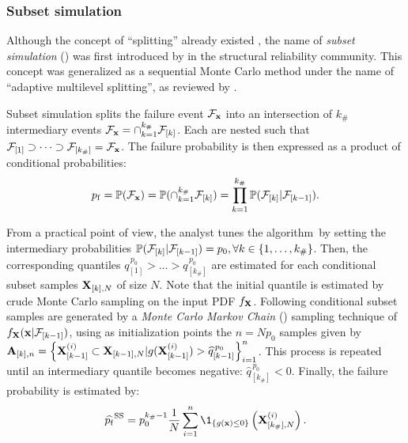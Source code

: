 

\subsubsection{Subset simulation}
Although the concept of ``splitting'' already existed \citep{kahn_1951_splitting}, the name of \textit{subset simulation} () was first introduced by \citet{AuBeck2001} in the structural reliability community. 
This concept was generalized as a sequential Monte Carlo method under the name of ``adaptive multilevel splitting'', as reviewed by \citet{cerou_2019_sequentialMC}. 

Subset simulation splits the failure event $\mathcal{F}_{{\bf x}}$ into an intersection of $k_\#$ intermediary events $\mathcal{F}_{{\bf x}} = \cap_{k=1}^{k_\#} \mathcal{F}_{[k]}$.
Each are nested such that $\mathcal{F}_{[1]} \supset \dots \supset \mathcal{F}_{[k_\#]} = \mathcal{F}_{{\bf x}}$.
The failure probability is then expressed as a product of conditional probabilities:
\begin{equation}
    p_\mathrm{f} = \mathbb{P}(\mathcal{F}_{{\bf x}}) = \mathbb{P}(\cap_{k=1}^{k_\#} \mathcal{F}_{[k]}) = \prod_{k=1}^{k_\#} \mathbb{P}(\mathcal{F}_{[k]} | \mathcal{F}_{[k-1]}).
\end{equation}

From a practical point of view, the analyst tunes the algorithm\footnotemark~by setting the intermediary probabilities $\mathbb{P}(\mathcal{F}_{[k]} | \mathcal{F}_{[k-1]}) = p_0, \forall k \in \{1, \dots, k_\# \}$. 
Then, the corresponding quantiles $q_{[1]}^{\, p_0} > \dots > q_{[k_\#]}^{\, p_0}$ are estimated for each conditional subset samples ${\bf X}_{[k], N}$ of size $N$. 
Note that the initial quantile is estimated by crude Monte Carlo sampling on the input PDF $f_{{\bf X}}$. 
Following conditional subset samples are generated by a \textit{Monte Carlo Markov Chain} () sampling technique of 
$f_{{\bf X}}({\bf x} |\mathcal{F}_{[k-1]})$, using as initialization points the $n= N p_0$ samples given by $\mathbf{A}_{[k], n}=\left\{{\bf X}_{[k-1]}^{(i)} \subset {\bf X}_{[k-1], N}| g({\bf X}_{[k-1]}^{(i)}) > \widehat{q}_{[k-1]}^{\, p_0} \right\}_{i=1}^n$. 
This process is repeated until an intermediary quantile becomes negative: $\widehat{q}_{[k_\#]}^{\, p_0} < 0$. 
Finally, the failure probability is estimated by:
\begin{equation}
    \widehat{\pf}^{\mathrm{SS}} = p_0^{k_\# -1} \frac1N \sum_{i=1}^n \1_{\{g(\bx) \leq 0\}} \left(\bX_{[k_\#],N}^{(i)}\right).
    \label{eq:pf_SS}
\end{equation}

